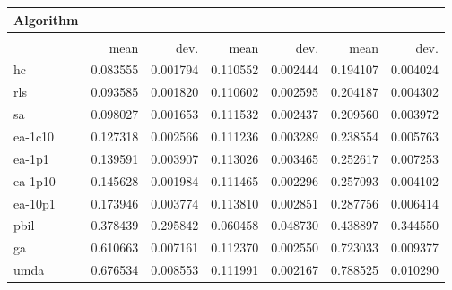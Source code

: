 \begin{tabular}{@{} l *{6}{>{{}}N{1}{2}} @{}}
\toprule
{Algorithm} &  \\
\midrule
&  &  &  \\
\midrule
& {mean} & {dev.} & {mean} & {dev.} & {mean} & {dev.} \\
\midrule
hc & 0.083555 & 0.001794 & 0.110552 & 0.002444 & 0.194107 & 0.004024 \\
rls & 0.093585 & 0.001820 & 0.110602 & 0.002595 & 0.204187 & 0.004302 \\
sa & 0.098027 & 0.001653 & 0.111532 & 0.002437 & 0.209560 & 0.003972 \\
ea-1c10 & 0.127318 & 0.002566 & 0.111236 & 0.003289 & 0.238554 & 0.005763 \\
ea-1p1 & 0.139591 & 0.003907 & 0.113026 & 0.003465 & 0.252617 & 0.007253 \\
ea-1p10 & 0.145628 & 0.001984 & 0.111465 & 0.002296 & 0.257093 & 0.004102 \\
ea-10p1 & 0.173946 & 0.003774 & 0.113810 & 0.002851 & 0.287756 & 0.006414 \\
pbil & 0.378439 & 0.295842 & 0.060458 & 0.048730 & 0.438897 & 0.344550 \\
ga & 0.610663 & 0.007161 & 0.112370 & 0.002550 & 0.723033 & 0.009377 \\
umda & 0.676534 & 0.008553 & 0.111991 & 0.002167 & 0.788525 & 0.010290 \\
\bottomrule
\end{tabular}
